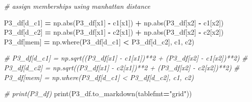 \documentclass[
]{article}
\newenvironment{Shaded}{\begin{snugshade}}{\end{snugshade}}
\newcommand{\BuiltInTok}[1]{#1}
\newcommand{\CommentTok}[1]{\textcolor[rgb]{0.56,0.35,0.01}{\textit{#1}}}
\newcommand{\NormalTok}[1]{#1}
\newcommand{\OperatorTok}[1]{\textcolor[rgb]{0.81,0.36,0.00}{\textbf{#1}}}
\newcommand{\StringTok}[1]{\textcolor[rgb]{0.31,0.60,0.02}{#1}}
\begin{document}
\begin{Shaded}
\begin{Highlighting}[]
\CommentTok{\# assign memberships using manhattan distance}

\NormalTok{P3\_df[}\StringTok{\textquotesingle{}d\_c1\textquotesingle{}}\NormalTok{] }\OperatorTok{=}\NormalTok{ np.}\BuiltInTok{abs}\NormalTok{(P3\_df[}\StringTok{\textquotesingle{}x1\textquotesingle{}}\NormalTok{] }\OperatorTok{{-}}\NormalTok{ c1[}\StringTok{\textquotesingle{}x1\textquotesingle{}}\NormalTok{]) }\OperatorTok{+}\NormalTok{ np.}\BuiltInTok{abs}\NormalTok{(P3\_df[}\StringTok{\textquotesingle{}x2\textquotesingle{}}\NormalTok{] }\OperatorTok{{-}}\NormalTok{ c1[}\StringTok{\textquotesingle{}x2\textquotesingle{}}\NormalTok{])}
\NormalTok{P3\_df[}\StringTok{\textquotesingle{}d\_c2\textquotesingle{}}\NormalTok{] }\OperatorTok{=}\NormalTok{ np.}\BuiltInTok{abs}\NormalTok{(P3\_df[}\StringTok{\textquotesingle{}x1\textquotesingle{}}\NormalTok{] }\OperatorTok{{-}}\NormalTok{ c2[}\StringTok{\textquotesingle{}x1\textquotesingle{}}\NormalTok{]) }\OperatorTok{+}\NormalTok{ np.}\BuiltInTok{abs}\NormalTok{(P3\_df[}\StringTok{\textquotesingle{}x2\textquotesingle{}}\NormalTok{] }\OperatorTok{{-}}\NormalTok{ c2[}\StringTok{\textquotesingle{}x2\textquotesingle{}}\NormalTok{])}
\NormalTok{P3\_df[}\StringTok{\textquotesingle{}mem\textquotesingle{}}\NormalTok{] }\OperatorTok{=}\NormalTok{ np.where(P3\_df[}\StringTok{\textquotesingle{}d\_c1\textquotesingle{}}\NormalTok{] }\OperatorTok{\textless{}}\NormalTok{ P3\_df[}\StringTok{\textquotesingle{}d\_c2\textquotesingle{}}\NormalTok{], }\StringTok{\textquotesingle{}c1\textquotesingle{}}\NormalTok{, }\StringTok{\textquotesingle{}c2\textquotesingle{}}\NormalTok{)}

\CommentTok{\# P3\_df[\textquotesingle{}d\_c1\textquotesingle{}] = np.sqrt((P3\_df[\textquotesingle{}x1\textquotesingle{}] {-} c1[\textquotesingle{}x1\textquotesingle{}])**2 + (P3\_df[\textquotesingle{}x2\textquotesingle{}] {-} c1[\textquotesingle{}x2\textquotesingle{}])**2)}
\CommentTok{\# P3\_df[\textquotesingle{}d\_c2\textquotesingle{}] = np.sqrt((P3\_df[\textquotesingle{}x1\textquotesingle{}] {-} c2[\textquotesingle{}x1\textquotesingle{}])**2 + (P3\_df[\textquotesingle{}x2\textquotesingle{}] {-} c2[\textquotesingle{}x2\textquotesingle{}])**2)}
\CommentTok{\# P3\_df[\textquotesingle{}mem\textquotesingle{}] = np.where(P3\_df[\textquotesingle{}d\_c1\textquotesingle{}] \textless{} P3\_df[\textquotesingle{}d\_c2\textquotesingle{}], \textquotesingle{}c1\textquotesingle{}, \textquotesingle{}c2\textquotesingle{})}

\CommentTok{\# print(P3\_df)}
\BuiltInTok{print}\NormalTok{(P3\_df.to\_markdown(tablefmt}\OperatorTok{=}\StringTok{"grid"}\NormalTok{))}
\end{Highlighting}
\end{Shaded}
\end{document}
